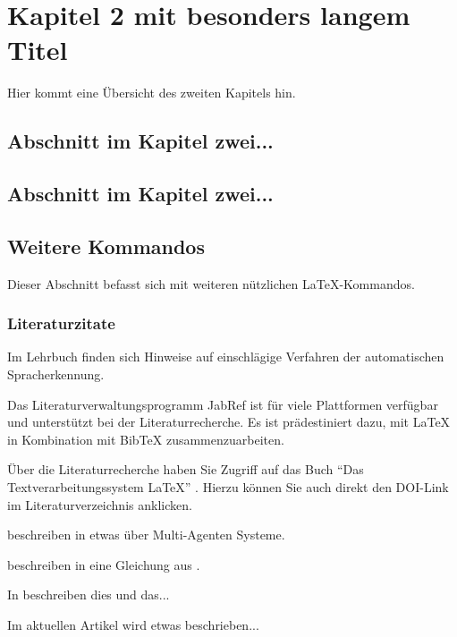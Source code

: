 \chapter{Kapitel 2 mit besonders langem Titel}
\label{sec:Kapitel2}

Hier kommt eine Übersicht des zweiten Kapitels hin.

\section{Abschnitt im Kapitel zwei...}
\label{sec:abschnitt2.1}

\section{Abschnitt im Kapitel zwei...}
%
%

\section{Weitere Kommandos}
Dieser Abschnitt befasst sich mit weiteren nützlichen \LaTeX-Kommandos.

\subsection{Literaturzitate}
\label{sec:literaturzitate}

Im Lehrbuch \autocite{Schukat-Talamazzini1995}
finden sich Hinweise auf einschlägige Verfahren der automatischen Spracherkennung.

Das Literaturverwaltungsprogramm JabRef \autocite{Kopp2018} ist für viele Plattformen verfügbar und unterstützt bei der Literaturrecherche. Es ist prädestiniert dazu, mit {\LaTeX} in Kombination mit {Bib\TeX} zusammenzuarbeiten.

Über die Literaturrecherche haben Sie Zugriff auf das Buch "`Das Textverarbeitungssystem LaTeX"' \autocite[15]{Oechsner2015}. Hierzu können Sie auch direkt den DOI-Link im Literaturverzeichnis anklicken.

\citeauthor{TyrinMultiAgent2012} beschreiben in \autocite{TyrinMultiAgent2012} etwas über Multi-Agenten Systeme. 

\citeauthor{Ghazali2012} beschreiben in \autocite{Ghazali2012} eine Gleichung aus \autocite{moore2007basic}.


In \autocite{Mamache2022} beschreiben \citeauthor{Mamache2022} dies und das...

Im aktuellen Artikel \autocite{Schaible2023} wird etwas beschrieben...

